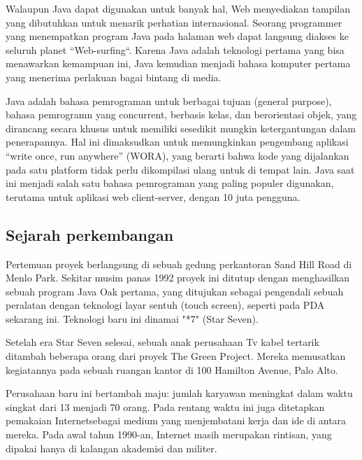 Walaupun Java dapat digunakan untuk banyak hal, Web menyediakan tampilan yang dibutuhkan untuk menarik perhatian internasional. Seorang programmer yang menempatkan program Java pada halaman web dapat langsung diakses ke seluruh planet “Web-surfing“. Karena Java adalah teknologi pertama yang bisa menawarkan kemampuan ini, Java kemudian menjadi bahasa komputer pertama yang menerima perlakuan bagai bintang di media.

Java adalah bahasa pemrograman untuk berbagai tujuan (general purpose), bahasa pemrogramn yang concurrent, berbasis kelas, dan berorientasi objek, yang dirancang secara khusus untuk memiliki sesedikit mungkin ketergantungan dalam penerapannya. Hal ini dimaksudkan untuk memungkinkan pengembang aplikasi “write once, run anywhere” (WORA), yang berarti bahwa kode yang dijalankan pada satu platform tidak perlu dikompilasi ulang untuk di tempat lain. Java saat ini menjadi salah satu bahasa pemrograman yang paling populer digunakan, terutama untuk aplikasi web client-server, dengan 10 juta pengguna.

\subsection{Sejarah perkembangan}

Pertemuan proyek berlangsung di sebuah gedung perkantoran Sand Hill Road di Menlo Park. Sekitar musim panas 1992 proyek ini ditutup dengan menghasilkan sebuah program Java Oak pertama, yang ditujukan sebagai pengendali sebuah peralatan dengan teknologi layar sentuh (touch screen), seperti pada PDA sekarang ini. Teknologi baru ini dinamai "*7" (Star Seven).

Setelah era Star Seven selesai, sebuah anak perusahaan Tv kabel tertarik ditambah beberapa orang dari proyek The Green Project. Mereka memusatkan kegiatannya pada sebuah ruangan kantor di 100 Hamilton Avenue, Palo Alto.

Perusahaan baru ini bertambah maju: jumlah karyawan meningkat dalam waktu singkat dari 13 menjadi 70 orang. Pada rentang waktu ini juga ditetapkan pemakaian Internetsebagai medium yang menjembatani kerja dan ide di antara mereka. Pada awal tahun 1990-an, Internet masih merupakan rintisan, yang dipakai hanya di kalangan akademisi dan militer.


